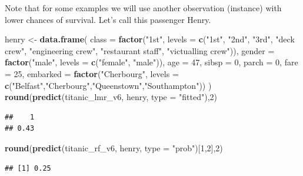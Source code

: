 \documentclass[12pt,]{krantz}
\newenvironment{Shaded}{\begin{snugshade}}{\end{snugshade}}
\newcommand{\DataTypeTok}[1]{\textcolor[rgb]{0.13,0.29,0.53}{#1}}
\newcommand{\DecValTok}[1]{\textcolor[rgb]{0.00,0.00,0.81}{#1}}
\newcommand{\KeywordTok}[1]{\textcolor[rgb]{0.13,0.29,0.53}{\textbf{#1}}}
\newcommand{\NormalTok}[1]{#1}
\newcommand{\StringTok}[1]{\textcolor[rgb]{0.31,0.60,0.02}{#1}}
\begin{document}
Note that for some examples we will use another observation (instance) with lower chances of survival. Let's call this passenger Henry.

\begin{Shaded}
\begin{Highlighting}[]
\NormalTok{henry <-}\StringTok{ }\KeywordTok{data.frame}\NormalTok{(}
            \DataTypeTok{class =} \KeywordTok{factor}\NormalTok{(}\StringTok{"1st"}\NormalTok{, }\DataTypeTok{levels =} \KeywordTok{c}\NormalTok{(}\StringTok{"1st"}\NormalTok{, }\StringTok{"2nd"}\NormalTok{, }\StringTok{"3rd"}\NormalTok{, }\StringTok{"deck crew"}\NormalTok{, }\StringTok{"engineering crew"}\NormalTok{, }\StringTok{"restaurant staff"}\NormalTok{, }\StringTok{"victualling crew"}\NormalTok{)),}
            \DataTypeTok{gender =} \KeywordTok{factor}\NormalTok{(}\StringTok{"male"}\NormalTok{, }\DataTypeTok{levels =} \KeywordTok{c}\NormalTok{(}\StringTok{"female"}\NormalTok{, }\StringTok{"male"}\NormalTok{)),}
            \DataTypeTok{age =} \DecValTok{47}\NormalTok{,}
            \DataTypeTok{sibsp =} \DecValTok{0}\NormalTok{,}
            \DataTypeTok{parch =} \DecValTok{0}\NormalTok{,}
            \DataTypeTok{fare =} \DecValTok{25}\NormalTok{,}
            \DataTypeTok{embarked =} \KeywordTok{factor}\NormalTok{(}\StringTok{"Cherbourg"}\NormalTok{, }\DataTypeTok{levels =} \KeywordTok{c}\NormalTok{(}\StringTok{"Belfast"}\NormalTok{,}\StringTok{"Cherbourg"}\NormalTok{,}\StringTok{"Queenstown"}\NormalTok{,}\StringTok{"Southampton"}\NormalTok{))}
\NormalTok{)}
\KeywordTok{round}\NormalTok{(}\KeywordTok{predict}\NormalTok{(titanic_lmr_v6, henry, }\DataTypeTok{type =} \StringTok{"fitted"}\NormalTok{),}\DecValTok{2}\NormalTok{)}
\end{Highlighting}
\end{Shaded}

\begin{verbatim}
##    1 
## 0.43
\end{verbatim}

\begin{Shaded}
\begin{Highlighting}[]
\KeywordTok{round}\NormalTok{(}\KeywordTok{predict}\NormalTok{(titanic_rf_v6, henry, }\DataTypeTok{type =} \StringTok{"prob"}\NormalTok{)[}\DecValTok{1}\NormalTok{,}\DecValTok{2}\NormalTok{],}\DecValTok{2}\NormalTok{)}
\end{Highlighting}
\end{Shaded}

\begin{verbatim}
## [1] 0.25
\end{verbatim}
\end{document}
